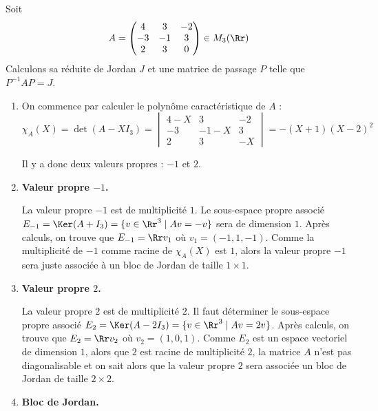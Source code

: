 \documentclass[12pt, class=report,crop=false]{standalone}
\begin{document}
  


\begin{exemple}
Soit 
$$A = \begin{pmatrix}
4 & 3 & -2 \\
-3 & -1 & 3 \\
2 & 3 & 0
\end{pmatrix}
\in M_3(\Rr)$$
Calculons sa réduite de Jordan $J$ et une matrice de passage $P$ telle que 
$P^{-1}AP = J$.

\begin{enumerate}
  \item On commence par calculer le polynôme caractéristique de $A$ :
  $$\chi_A(X) = \det(A-XI_3) = 
  \begin{vmatrix}
  4-X & 3 & -2 \\
  -3 & -1-X & 3 \\
  2 & 3 & -X  
  \end{vmatrix}
  = - (X+1)(X-2)^2$$
  
  Il y a donc deux valeurs propres : $-1$ et $2$.
  
  \item \textbf{Valeur propre $-1$.}
  
  La valeur propre $-1$ est de multiplicité $1$. Le sous-espace propre associé $E_{-1} = \Ker(A+I_3) = \{ v \in \Rr^3 \mid Av = -v\}$ sera de dimension $1$. Après calculs, on trouve que $E_{-1} = \Rr v_1$ où
  $v_1 = (-1,1,-1)$. Comme la multiplicité de $-1$ comme racine de $\chi_A(X)$ est $1$, alors
  la valeur propre $-1$ sera juste associée à un bloc de Jordan de taille $1\times 1$.
  
  \item \textbf{Valeur propre $2$.}
  
  La valeur propre $2$ est de multiplicité $2$. Il faut déterminer le sous-espace propre associé $E_{2} = \Ker(A-2I_3) = \{ v \in \Rr^3 \mid Av = 2v\}$. 
  Après calculs, on trouve que $E_{2} = \Rr v_2$ où
  $v_2 = (1,0,1)$. Comme $E_2$ est un espace vectoriel de dimension $1$, alors que $2$ est racine de multiplicité $2$, la matrice $A$ n'est pas diagonalisable et on sait alors que la valeur propre $2$ sera associée un bloc de Jordan de taille $2\times 2$.

  
  \item \textbf{Bloc de Jordan.}


\end{enumerate}
\end{exemple}
\end{document}
